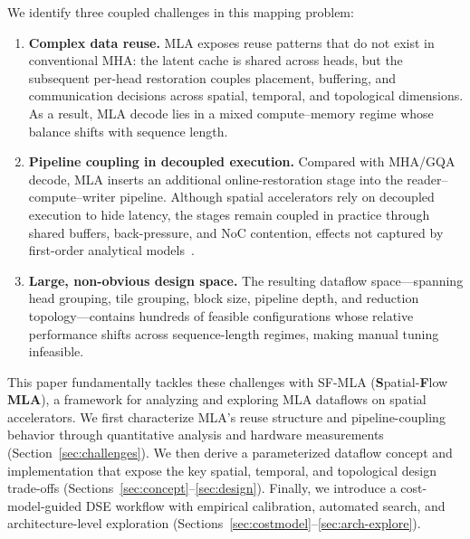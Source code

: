 \documentclass[sigconf, review, anonymous]{acmart}
\newcommand{\brand}{SF-MLA}
\newcommand{\brandexpansion}{\textbf{S}patial-\textbf{F}low \textbf{MLA}}
\newcommand{\sysname}{\textsc{\brand}\xspace}
\begin{document}
We identify three coupled challenges in this mapping problem:
\begin{enumerate}
  \item \textbf{Complex data reuse.}  MLA exposes reuse patterns that do
    not exist in conventional MHA: the latent cache is shared across
    heads, but the subsequent per-head restoration couples placement,
    buffering, and communication decisions across spatial, temporal,
    and topological dimensions.  As a result, MLA decode lies in a
    mixed compute--memory regime whose balance shifts with sequence
    length.
  \item \textbf{Pipeline coupling in decoupled execution.}
    Compared with MHA/GQA decode, MLA inserts an additional
    online-restoration stage into the reader--compute--writer pipeline.
    Although spatial accelerators rely on decoupled execution to hide
    latency, the stages remain coupled in practice through shared
    buffers, back-pressure, and NoC contention, effects not captured by
    first-order analytical models~\cite{parashar2019timeloop,
    kwon2019maestro}.
  \item \textbf{Large, non-obvious design space.}  The resulting
    dataflow space---spanning head grouping, tile grouping, block size,
    pipeline depth, and reduction topology---contains hundreds of
    feasible configurations whose relative performance shifts across
    sequence-length regimes, making manual tuning infeasible.
\end{enumerate}

This paper fundamentally tackles these challenges with \sysname
(\brandexpansion), a framework for analyzing and exploring MLA
dataflows on spatial accelerators.  We first characterize MLA's reuse
structure and pipeline-coupling behavior through quantitative analysis
and hardware measurements (Section~\ref{sec:challenges}).  We then
derive a parameterized dataflow concept and implementation that expose
the key spatial, temporal, and topological design trade-offs
(Sections~\ref{sec:concept}--\ref{sec:design}).  Finally, we introduce
a cost-model-guided DSE workflow with empirical calibration, automated
search, and architecture-level exploration
(Sections~\ref{sec:costmodel}--\ref{sec:arch-explore}).
\end{document}
